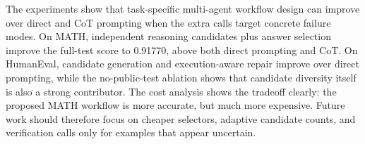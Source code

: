 \documentclass{article}
\begin{document}
The experiments show that task-specific multi-agent workflow design can improve over direct and CoT prompting when the extra calls target concrete failure modes. On MATH, independent reasoning candidates plus answer selection improve the full-test score to 0.91770, above both direct prompting and CoT. On HumanEval, candidate generation and execution-aware repair improve over direct prompting, while the no-public-test ablation shows that candidate diversity itself is also a strong contributor. The cost analysis shows the tradeoff clearly: the proposed MATH workflow is more accurate, but much more expensive. Future work should therefore focus on cheaper selectors, adaptive candidate counts, and verification calls only for examples that appear uncertain.



\end{document}

